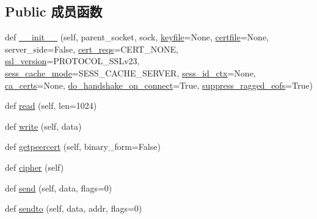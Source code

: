 \subsection*{Public 成员函数}
\begin{DoxyCompactItemize}
\item 
def \mbox{\hyperlink{classforge_1_1ssl_1_1_s_s_l_socket_a97e3b1a9ff4c70873287eae17a0acc3d}{\+\_\+\+\_\+init\+\_\+\+\_\+}} (self, parent\+\_\+socket, sock, \mbox{\hyperlink{classforge_1_1ssl_1_1_s_s_l_socket_a95ee7412166c35665a476aa60222fe87}{keyfile}}=None, \mbox{\hyperlink{classforge_1_1ssl_1_1_s_s_l_socket_a3562b6e1eadabd53356d211f7d03a039}{certfile}}=None, server\+\_\+side=False, \mbox{\hyperlink{classforge_1_1ssl_1_1_s_s_l_socket_a1266c34b9e0b1493b2bfcb35bca71684}{cert\+\_\+reqs}}=C\+E\+R\+T\+\_\+\+N\+O\+NE, \mbox{\hyperlink{classforge_1_1ssl_1_1_s_s_l_socket_a0c5acb8e8e849a8cd4c58a68dee02824}{ssl\+\_\+version}}=P\+R\+O\+T\+O\+C\+O\+L\+\_\+\+S\+S\+Lv23, \mbox{\hyperlink{classforge_1_1ssl_1_1_s_s_l_socket_a0612d90ce68eacadf3741707d170e92f}{sess\+\_\+cache\+\_\+mode}}=S\+E\+S\+S\+\_\+\+C\+A\+C\+H\+E\+\_\+\+S\+E\+R\+V\+ER, \mbox{\hyperlink{classforge_1_1ssl_1_1_s_s_l_socket_a64b55ecae20d607f84c8fa64bca066ed}{sess\+\_\+id\+\_\+ctx}}=None, \mbox{\hyperlink{classforge_1_1ssl_1_1_s_s_l_socket_a571438403f0b5c1d0a66c9e5729069bc}{ca\+\_\+certs}}=None, \mbox{\hyperlink{classforge_1_1ssl_1_1_s_s_l_socket_a948ce27f6c3ae2b3d38745838899ca81}{do\+\_\+handshake\+\_\+on\+\_\+connect}}=True, \mbox{\hyperlink{classforge_1_1ssl_1_1_s_s_l_socket_a9c816a1e9249f9ddbe51e5c51a18a2f5}{suppress\+\_\+ragged\+\_\+eofs}}=True)
\item 
def \mbox{\hyperlink{classforge_1_1ssl_1_1_s_s_l_socket_a144df4b280e6a4f0663a06482028e201}{read}} (self, len=1024)
\item 
def \mbox{\hyperlink{classforge_1_1ssl_1_1_s_s_l_socket_a8e56598cdc86ce04148d15b75facafa7}{write}} (self, data)
\item 
def \mbox{\hyperlink{classforge_1_1ssl_1_1_s_s_l_socket_a89c7514819f37d187aad23a85bc27948}{getpeercert}} (self, binary\+\_\+form=False)
\item 
def \mbox{\hyperlink{classforge_1_1ssl_1_1_s_s_l_socket_acb49d5aa36898812e7e9d58ced6227d8}{cipher}} (self)
\item 
def \mbox{\hyperlink{classforge_1_1ssl_1_1_s_s_l_socket_a346fe65abfc6f15cf839c9936b81b0bc}{send}} (self, data, flags=0)
\item 
def \mbox{\hyperlink{classforge_1_1ssl_1_1_s_s_l_socket_a46696866abbec255f2b9b85eb7461a13}{sendto}} (self, data, addr, flags=0)

\end{DoxyCompactItemize}
